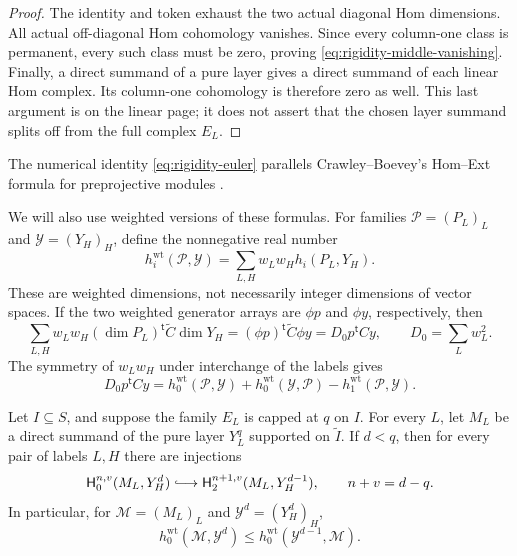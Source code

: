 \begin{proof}
The identity and token exhaust the two actual diagonal Hom dimensions.
All actual off-diagonal Hom cohomology vanishes.  Since every column-one
class is permanent, every such class must be zero, proving
\eqref{eq:rigidity-middle-vanishing}.  Finally, a direct summand of a pure
layer gives a direct summand of each linear Hom complex.  Its column-one
cohomology is therefore zero as well.  This last argument is on the
linear page; it does not assert that the chosen layer summand splits off
from the full complex $E_L$.
\end{proof}

The numerical identity \eqref{eq:rigidity-euler} parallels
Crawley--Boevey's Hom--Ext formula for preprojective modules
\cite[Lemma~1]{CrawleyBoevey2000}.

We will also use weighted versions of these formulas.  For families
$\mathcal P=(P_L)_L$ and $\mathcal Y=(Y_H)_H$, define the nonnegative real
number
\[
 h_i^{\mathrm{wt}}(\mathcal P,\mathcal Y)
   =\sum_{L,H}w_Lw_H h_i(P_L,Y_H).
\]
These are weighted dimensions, not necessarily integer dimensions of
vector spaces.  If the two weighted generator arrays are $\phi p$ and
$\phi y$, respectively, then
\[
 \sum_{L,H}w_Lw_H
 (\dim P_L)^{\mathsf t}\widetilde C\dim Y_H
   =(\phi p)^{\mathsf t}\widetilde C\phi y
   =D_0p^{\mathsf t}Cy,
 \qquad D_0=\sum_Lw_L^2.
\]
The symmetry of $w_Lw_H$ under interchange of the labels gives
\begin{equation}
 D_0p^{\mathsf t}Cy
   =h_0^{\mathrm{wt}}(\mathcal P,\mathcal Y)
    +h_0^{\mathrm{wt}}(\mathcal Y,\mathcal P)
    -h_1^{\mathrm{wt}}(\mathcal P,\mathcal Y).
 \label{eq:rigidity-weighted-euler}
\end{equation}

\begin{lemma}
\label{lem:rigidity-secondary-injection}
Let $I\subseteq S$, and suppose the family $E_L$ is capped at $q$ on $I$.
For every $L$, let $M_L$ be a direct summand of the pure layer $Y_L^q$
supported on $\widetilde I$.  If $d<q$, then for every pair of labels $L,H$
there are injections
\begin{equation}
 \mathsf H_0^{n,v}(M_L,Y_H^d)
   \lhook\joinrel\longrightarrow
 \mathsf H_2^{n+1,v}(M_L,Y_H^{d-1}),
 \qquad n+v=d-q.
 \label{eq:rigidity-secondary-injection}
\end{equation}
In particular, for $\mathcal M=(M_L)_L$ and
$\mathcal Y^d=(Y_H^d)_H$,
\begin{equation}
 h_0^{\mathrm{wt}}(\mathcal M,\mathcal Y^d)
 \le h_0^{\mathrm{wt}}(\mathcal Y^{d-1},\mathcal M).
 \label{eq:rigidity-secondary-bound}
\end{equation}
\end{lemma}

